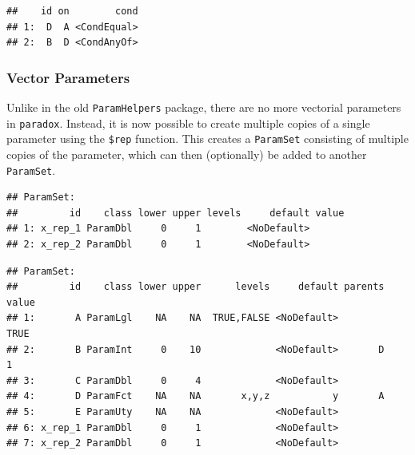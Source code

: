 \documentclass[]{scrbook}
\newenvironment{Shaded}{\begin{snugshade}}{\end{snugshade}}
\newcommand{\DataTypeTok}[1]{\textcolor[rgb]{0.13,0.29,0.53}{#1}}
\newcommand{\DecValTok}[1]{\textcolor[rgb]{0.00,0.00,0.81}{#1}}
\newcommand{\KeywordTok}[1]{\textcolor[rgb]{0.13,0.29,0.53}{\textbf{#1}}}
\newcommand{\NormalTok}[1]{#1}
\newcommand{\OperatorTok}[1]{\textcolor[rgb]{0.81,0.36,0.00}{\textbf{#1}}}
\newcommand{\StringTok}[1]{\textcolor[rgb]{0.31,0.60,0.02}{#1}}
\renewenvironment{Shaded} {\begin{snugshade}\small} {\end{snugshade}}
\begin{document}
\begin{Shaded}
\end{Shaded}

\begin{verbatim}
##    id on        cond
## 1:  D  A <CondEqual>
## 2:  B  D <CondAnyOf>
\end{verbatim}

\hypertarget{vector-parameters}{%
\subsubsection{Vector Parameters}\label{vector-parameters}}

Unlike in the old \texttt{ParamHelpers} package, there are no more vectorial parameters in \texttt{paradox}.
Instead, it is now possible to create multiple copies of a single parameter using the \texttt{\$rep} function.
This creates a \texttt{ParamSet} consisting of multiple copies of the parameter, which can then (optionally) be added to another \texttt{ParamSet}.

\begin{Shaded}
\end{Shaded}

\begin{verbatim}
## ParamSet: 
##         id    class lower upper levels     default value
## 1: x_rep_1 ParamDbl     0     1        <NoDefault>      
## 2: x_rep_2 ParamDbl     0     1        <NoDefault>
\end{verbatim}

\begin{Shaded}
\end{Shaded}

\begin{verbatim}
## ParamSet: 
##         id    class lower upper      levels     default parents value
## 1:       A ParamLgl    NA    NA  TRUE,FALSE <NoDefault>          TRUE
## 2:       B ParamInt     0    10             <NoDefault>       D     1
## 3:       C ParamDbl     0     4             <NoDefault>              
## 4:       D ParamFct    NA    NA       x,y,z           y       A      
## 5:       E ParamUty    NA    NA             <NoDefault>              
## 6: x_rep_1 ParamDbl     0     1             <NoDefault>              
## 7: x_rep_2 ParamDbl     0     1             <NoDefault>
\end{verbatim}
\end{document}
